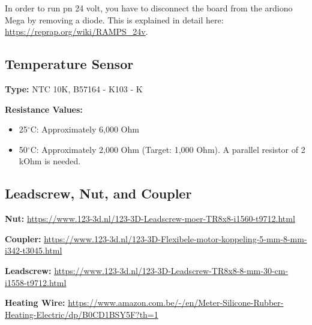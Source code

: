 In order to run pn 24 volt, you have to disconnect the board from the ardiono Mega by removing a diode.
This is explained in detail here: \url{https://reprap.org/wiki/RAMPS_24v}.

\subsection{Temperature Sensor}

\textbf{Type:} NTC 10K, B57164 - K103 - K

\textbf{Resistance Values:}
\begin{itemize}
    \item 25$^\circ$C: Approximately 6,000 Ohm
    \item 50$^\circ$C: Approximately 2,000 Ohm (Target: 1,000 Ohm).  A parallel resistor of 2 kOhm is needed.
\end{itemize}

\subsection{Leadscrew, Nut, and Coupler}

\textbf{Nut:} \url{https://www.123-3d.nl/123-3D-Leadscrew-moer-TR8x8-i1560-t9712.html}

\textbf{Coupler:} \url{https://www.123-3d.nl/123-3D-Flexibele-motor-koppeling-5-mm-8-mm-i342-t3045.html}

\textbf{Leadscrew:} \url{https://www.123-3d.nl/123-3D-Leadscrew-TR8x8-8-mm-30-cm-i1558-t9712.html}

\textbf{Heating Wire:} \url{https://www.amazon.com.be/-/en/Meter-Silicone-Rubber-Heating-Electric/dp/B0CD1BSY5F?th=1}
